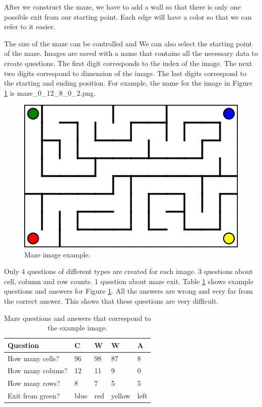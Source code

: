 \documentclass[11pt]{article}
\begin{document}
After we construct the maze, we have to add a wall so that there is only one possible exit from our starting point. Each edge will have a color so that we can refer to it easier.

The size of the maze can be controlled and We can also select the starting point of the maze. Images are saved with a name that contains all the necessary data to create questions. The first digit corresponds to the index of the image. The next two digits correspond to dimension of the image. The last digits correspond to the starting and ending position. For example, the name for the image in Figure \ref{fig:maze_example} is maze\_0\_12\_8\_0\_2.png.

\begin{figure}[ht]
    \centering
    \includegraphics[width=\linewidth]{maze_0_12_8_0_2.png}
    \caption{Maze image example.}
    \label{fig:maze_example}
\end{figure}

Only 4 questions of different types are created for each image. 3 questions about cell, column and row counts. 1 question about maze exit. Table \ref{tab:maze_example} shows example questions and answers for Figure \ref{fig:maze_example}. All the answers are wrong and very far from the correct answer. This shows that these questions are very difficult.

\begin{table}[ht]
\centering
\begin{tabular}{lllll}
\toprule
Question                               & C    & W  & W & A  \\ \midrule
How many cells?                        & 96   & 98  & 87 & 8    \\
How many colums?                       & 12   & 11  & 9 & 0      \\
How many rows?                         & 8    & 7   & 5 & 5     \\ \midrule
Exit from green? & blue & red & yellow & left \\ \bottomrule
\end{tabular}
\caption{Maze questions and answers that correspond to the example image.}
\label{tab:maze_example}
\end{table}
\end{document}
